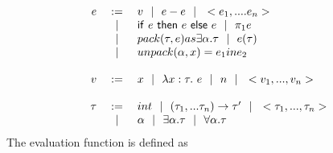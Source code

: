 \documentclass[10pt]{article}
\begin{document}
\[
\begin{array}{rcl}
e  &:=&  v \alt e-e \alt  < e_1, .... e_n >  \\
&\alt& \ife{e}{e}{e} \alt  \pi_1e  \\
&\alt&  pack ( \tau, e) \space as \space \exists \alpha. \tau \alt e(\tau)  \\
&\alt&  unpack ( \alpha, x) = e_1 in e_2   \\
\\ %
v  &:=&  x \alt \lamdefe{x:\tau}{e} \alt n \alt <v_1,...,v_n> \\
\\
\tau  &:=& int \alt \funct{(\tau_1,...\tau_n)}{\tau'} \alt <\tau_1,...,\tau_n>\\
&\alt&  \alpha \alt \exists \alpha.\tau \alt \forall \alpha.\tau \\
\end{array}
\]
                                                                    \vskip 0.2in
The evaluation function is defined as
\vskip 0.1in
\end{document}
